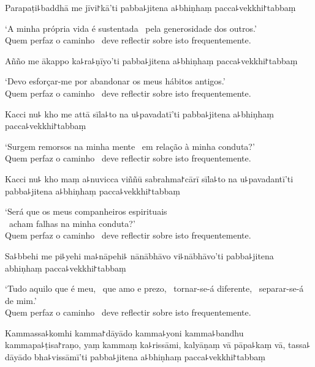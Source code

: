 Parapaṭi꜕baddhā me jīvi꜓kā'ti pabba꜕jitena a꜕bhiṇhaṃ pacca꜕vekkhi꜓tabbaṃ

\begin{english}
  `A minha própria vida é sustentada \pause\ pela generosidade dos outros.' \pause\\
  Quem perfaz o caminho \pause\ deve reflectir sobre isto frequentemente.
\end{english}

Añño me ākappo ka꜕ra꜕ṇīyo'ti pabba꜕jitena a꜕bhiṇhaṃ pacca꜕vekkhi꜓tabbaṃ

\begin{english}
  `Devo esforçar-me por abandonar os meus hábitos antigos.' \pause\\
  Quem perfaz o caminho \pause\ deve reflectir sobre isto frequentemente.
\end{english}

\clearpage

Kacci nu꜕ kho me attā sīla꜕to na u꜕pavadatī'ti pabba꜕jitena a꜕bhiṇhaṃ pacca꜕vekkhi꜓tabbaṃ

\begin{english}
  `Surgem remorsos na minha mente \pause\ em relação à minha conduta?' \pause\\
  Quem perfaz o caminho \pause\ deve reflectir sobre isto frequentemente.
\end{english}

Kacci nu꜕ kho maṃ a꜕nuvicca viññū sabrahma꜓cārī sīla꜕to na u꜕pavadantī'ti pabba꜕jitena a꜕bhiṇhaṃ pacca꜕vekkhi꜓tabbaṃ

\begin{english}
  `Será que os meus companheiros espirituais \pause\\\
  acham falhas na minha conduta?' \pause\\
  Quem perfaz o caminho \pause\ deve reflectir sobre isto frequentemente.
\end{english}

Sa꜕bbehi me pi꜕yehi ma꜕nāpehi꜕ nānābhāvo vi꜕nābhāvo'ti pabba꜕jitena abhiṇhaṃ pacca꜕vekkhi꜓tabbaṃ

\begin{english}
  `Tudo aquilo que é meu, \pause\ que amo e prezo, \pause\ tornar-se-á diferente, \pause\ separar-se-á de mim.' \pause\\
  Quem perfaz o caminho \pause\ deve reflectir sobre isto frequentemente.
\end{english}

Kammassa꜕komhi kamma꜓dāyādo kamma꜕yoni kamma꜕bandhu kammapa꜕ṭisa꜓raṇo, yaṃ kammaṃ ka꜕rissāmi, kalyāṇaṃ vā pāpa꜕kaṃ vā, tassa꜕ dāyādo bha꜕vissāmī'ti pabba꜕jitena a꜕bhiṇhaṃ pacca꜕vekkhi꜓tabbaṃ


